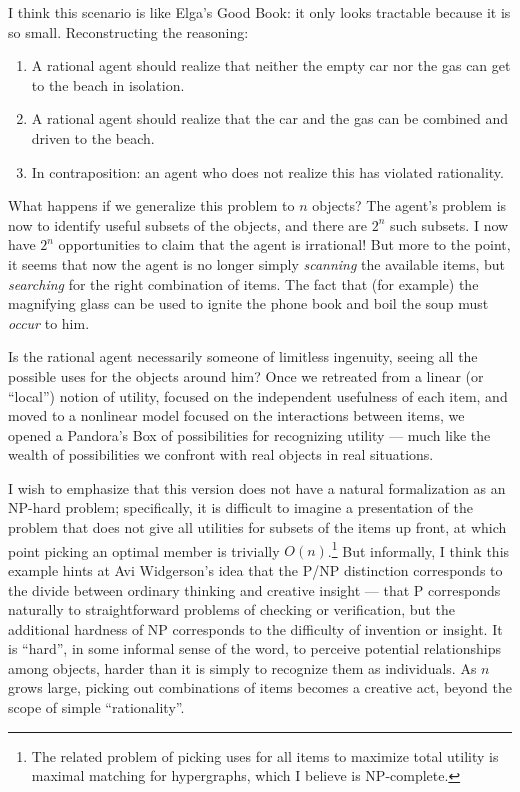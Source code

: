 \documentclass[letterpaper,12pt]{article}
\begin{document}
I think this scenario is like Elga's Good Book: it only looks tractable because it is so small. Reconstructing the reasoning:
\begin{enumerate}
\item
A rational agent should realize that neither the empty car nor the gas can get to the beach in isolation.
\item
A rational agent should realize that the car and the gas can be combined and driven to the beach.
\item
In contraposition: an agent who does not realize this has violated rationality.
\end{enumerate}

What happens if we generalize this problem to $n$ objects? The agent's problem is now to identify useful subsets of the objects, and there are $2^n$ such subsets. I now have $2^n$ opportunities to claim that the agent is irrational! But more to the point, it seems that now the agent is no longer simply \emph{scanning} the available items, but \emph{searching} for the right combination of items. The fact that (for example) the magnifying glass can be used to ignite the phone book and boil the soup must \emph{occur} to him.

Is the rational agent necessarily someone of limitless ingenuity, seeing all the possible uses for the objects around him? Once we retreated from a linear (or ``local'') notion of utility, focused on the independent usefulness of each item, and moved to a nonlinear model focused on the interactions between items, we opened a Pandora's Box of possibilities for recognizing utility --- much like the wealth of possibilities we confront with real objects in real situations.

I wish to emphasize that this version does not have a natural formalization as an NP-hard problem; specifically, it is difficult to imagine a presentation of the problem that does not give all utilities for subsets of the items up front, at which point picking an optimal member is trivially $O(n)$.\footnote{The related problem of picking uses for all items to maximize total utility is maximal matching for hypergraphs, which I believe is NP-complete.} But informally, I think this example hints at Avi Widgerson's idea \citeyearpar{widgerson2009creativity} that the P/NP distinction corresponds to the divide between ordinary thinking and creative insight --- that P corresponds naturally to straightforward problems of checking or verification, but the additional hardness of NP corresponds to the difficulty of invention or insight. It is ``hard'', in some informal sense of the word, to perceive potential relationships among objects, harder than it is simply to recognize them as individuals. As $n$ grows large, picking out combinations of items becomes a creative act, beyond the scope of simple ``rationality''.
\end{document}
